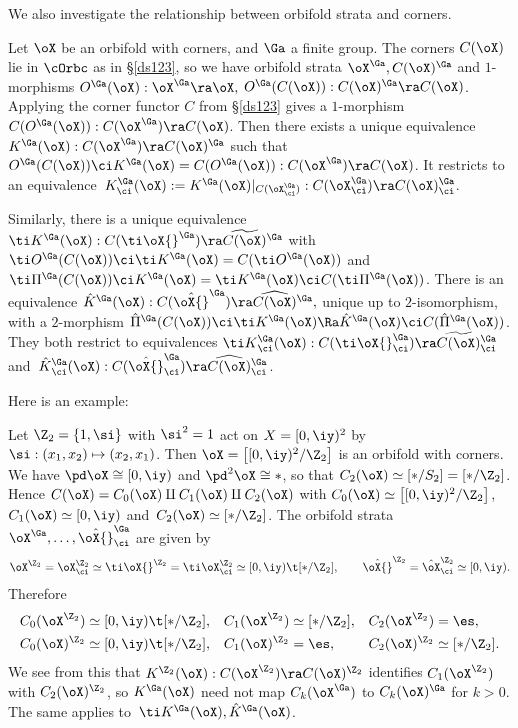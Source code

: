 \documentclass{article}
\begin{document}
We also investigate the relationship between orbifold strata and
corners.

\begin{thm} Let\/ $\oX$ be an orbifold with corners, and\/ $\Ga$ a
finite group. The corners $C(\oX)$ lie in $\cOrbc$ as in
{\rm\S\ref{ds123},} so we have orbifold strata $\oX^\Ga,C(\oX)^\Ga$
and\/ $1$-morphisms $O^\Ga(\oX):\oX^\Ga\ra\oX,$
$O^\Ga(C(\oX)):C(\oX)^\Ga\ra C(\oX)$. Applying the corner functor
$C$ from {\rm\S\ref{ds123}} gives a $1$-morphism
$C(O^\Ga(\oX)):C(\oX^\Ga)\ra C(\oX)$. Then there exists a unique
equivalence $K^\Ga(\oX):C(\oX^\Ga)\ra C(\oX)^\Ga$ such that\/
$O^\Ga(C(\oX))\ci K^\Ga(\oX)=C(O^\Ga(\oX)):C(\oX^\Ga)\ra C(\oX)$. It
restricts to an equivalence~$K^\Ga_\ci(\oX):=K^\Ga(\oX)
\vert_{\smash{C(\oX_\ci^\Ga) }}:C(\oX^\Ga_\ci)\ra C(\oX)^\Ga_\ci$.

Similarly, there is a unique equivalence $\ti K{}^\Ga(\oX):
C(\ti\oX{}^\Ga)\ra\,\,\,\widetilde{\!\!\!C(\oX)\!\!\!}\,\,\,^\Ga$
with\/ $\ti O{}^\Ga(C(\oX))\ci\ti K{}^\Ga(\oX)= C(\ti O{}^\Ga(\oX))$
and\/ $\ti\Pi{}^\Ga(C(\oX))\ci K{}^\Ga(\oX)=\ti K{}^\Ga(\oX)\ci
C(\ti\Pi{}^\Ga(\oX))$. There is an equivalence\/ $\hat
K{}^\Ga(\oX):C(\hat\oX{}^\Ga)\ra \,\,\,\widehat{\!\!\!
C(\oX)\!\!\!}\,\,\,^\Ga,$ unique up to $2$-isomorphism, with a
$2$-morphism $\hat\Pi{}^\Ga(C(\oX))\ci\ti K{}^\Ga(\oX)\Ra\hat
K{}^\Ga(\oX)\ci C(\hat\Pi{}^\Ga(\oX))$. They both restrict to
equivalences $\ti K{}^\Ga_\ci(\oX):C(\ti\oX{}^\Ga_\ci)\ra
\,\,\,\widetilde{\!\!\!C(\oX)\!\!\!}\,\,\,^\Ga_\ci$ and\/~$\hat
K{}^\Ga_\ci(\oX):C(\hat\oX{}^\Ga_\ci)\ra \,\,\,\widehat{\!\!\!
C(\oX)\!\!\!}\,\,\,^\Ga_\ci$.
\label{ds12thm5}
\end{thm}

Here is an example:

\begin{ex} Let $\Z_2=\{1,\si\}$ with $\si^2=1$ act on $X=[0,\iy)^2$ by
$\si:(x_1,x_2)\mapsto(x_2,x_1)$. Then $\oX=\bigl[
[0,\iy)^2/\Z_2\bigr]$ is an orbifold with corners. We have
$\pd\oX\cong[0,\iy)$ and $\pd^2\oX\cong *$, so that
$C_2(\oX)\simeq[*/S_2]=[*/\Z_2]$. Hence $C(\oX)=C_0(\oX)\amalg
C_1(\oX)\amalg C_2(\oX)$ with $C_0(\oX)\simeq\bigl[
[0,\iy)^2/\Z_2\bigr]$, $C_1(\oX)\simeq[0,\iy)$
and~$C_2(\oX)\simeq[*/\Z_2]$. The orbifold strata
$\oX^\Ga,\ldots,\hat\oX{}^\Ga_\ci$ are given by
\begin{equation*}
\oX^{\Z_2}=\oX^{\Z_2}_\ci\simeq\ti\oX{}^{\Z_2}=
\ti\oX^{\Z_2}_\ci\simeq[0,\iy)\t[*/\Z_2],\qquad
\hat\oX{}^{\Z_2}=\hat\oX^{\Z_2}_\ci\simeq[0,\iy).
\end{equation*}
Therefore
\begin{align*}
C_0(\oX^{\Z_2})&\simeq[0,\iy)\t[*/\Z_2], & C_1(\oX^{\Z_2})&\simeq [*/\Z_2],
& C_2(\oX^{\Z_2})&=\es,\\
C_0(\oX)^{\Z_2}&\simeq [0,\iy)\t[*/\Z_2], & C_1(\oX)^{\Z_2}&=\es,
& C_2(\oX)^{\Z_2}&\simeq [*/\Z_2].
\end{align*}
We see from this that $K^{\Z_2}(\oX):C(\oX^{\Z_2})\ra C(\oX)^{\Z_2}$
identifies $C_1(\oX^{\Z_2})$ with $C_2(\oX)^{\Z_2}$, so $K^\Ga(\oX)$
need not map $C_k(\oX^\Ga)$ to $C_k(\oX)^\Ga$ for $k>0$. The same
applies to~$\ti K{}^\Ga(\oX),\hat K{}^\Ga(\oX)$.
\label{ds12ex3}
\end{ex}
\end{document}
